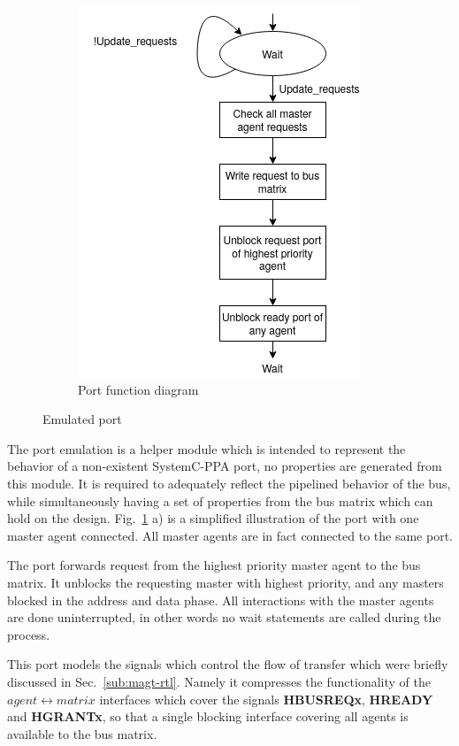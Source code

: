 \begin{figure}[hbt]
\begin{subfigure}[b]{0.3\linewidth}
 \includegraphics[width=\linewidth]{figs/ESL/port_fsm.png}
 \caption{Port function diagram}
 \end{subfigure}
\caption{Emulated port}
\label{fig:em-port}
\end{figure}


The port emulation is a helper module which is intended to represent the behavior of a non-existent SystemC-PPA port, no properties are generated from this module. It is required to adequately reflect the pipelined behavior of the bus, while simultaneously having a set of properties from the bus matrix which can hold on the design. Fig.~\ref{fig:em-port} a) is a simplified illustration of the port with one master agent connected. All master agents are in fact connected to the same port. \par
The port forwards request from the highest priority master agent to the bus matrix. It unblocks the requesting master with highest priority, and any masters blocked in the address and data phase. All interactions with the master agents are done uninterrupted, in other words no wait statements are called during the process. \par
This port models the signals which control the flow of transfer which were briefly discussed in Sec.~\ref{sub:magt-rtl}. Namely it compresses the functionality of the $agent\leftrightarrow matrix$ interfaces which cover the signals \textbf{HBUSREQx}, \textbf{HREADY} and \textbf{HGRANTx}, so that a single blocking interface covering all agents is available to the bus matrix.






